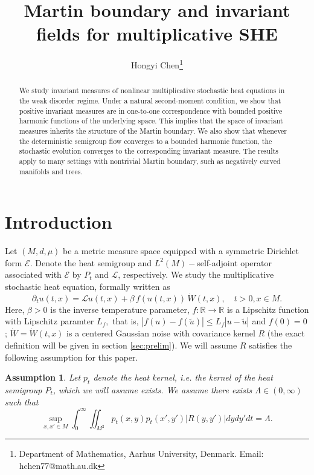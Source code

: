 \documentclass{article}
\title{Martin boundary and invariant fields for multiplicative SHE}
\author{Hongyi Chen\footnote{Department of Mathematics, Aarhus University, Denmark. Email: hchen77@math.au.dk}}
\newtheorem{assumption}[theorem]{Assumption}
\numberwithin{theorem}{section}
\def\RR{\mathbb{R}} %
\def\mc{\mathcal}
\begin{document}
\maketitle
\begin{abstract}
    \noindent We study invariant measures of nonlinear multiplicative stochastic heat equations in the weak disorder regime. Under a natural second-moment condition, we show that positive invariant measures are in one-to-one correspondence with bounded positive harmonic functions of the underlying space. This implies that the space of invariant measures inherits the structure of the Martin boundary. We also show that whenever the deterministic semigroup flow converges to a bounded harmonic function, the stochastic evolution converges to the corresponding invariant measure. The results apply to many settings with nontrivial Martin boundary, such as negatively curved manifolds and trees.
\end{abstract}
\tableofcontents
\section{Introduction}\label{sec:intro}
Let $(M,d,\mu)$ be a metric measure space equipped with a symmetric Dirichlet form $\mc{E}$. Denote the heat semigroup and $L^2(M)-$self-adjoint operator associated with $\mc{E}$ by $P_t$ and $\mc{L}$, respectively.
We study the multiplicative stochastic heat equation, formally written as \begin{equation}\label{eq:SHE}
\partial_t u(t,x)=\mc{L} u(t,x)+\beta\,f(u(t,x))\,\dot W(t,x), \quad t>0,x\in M.
\end{equation}
Here, \(\beta>0\) is the inverse temperature parameter, $f:\RR\to\RR$ is a Lipschitz function with Lipschitz paramter $L_f,$ that is, \(|f(u)-f(\tilde{u})|\leq L_f|u-\tilde{u}|\) and $f(0)=0$; \(\dot{W}=\dot{W}(t,x)\) is a centered Gaussian noise with covariance kernel $R$ (the exact definition will be given in section \ref{sec:prelim}). We will assume $R$ satisfies the following assumption for this paper.
\begin{assumption}\label{assump:WD}
    Let $p_t$ denote the heat kernel, i.e. the kernel of the heat semigroup $P_t$, which we will assume exists. We assume there exists $\Lambda\in(0,\infty)$ such that \[\sup_{x,x'\in M}\int_0^{\infty}\iint_{M^2}p_t(x,y)p_t(x',y')|R(y,y')|dydy'dt=\Lambda.\]
\end{assumption}
\end{document}
